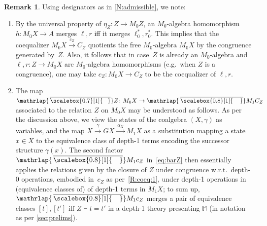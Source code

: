 \documentclass[sigconf,
			final%
			nonacm
                        ]{acmart}
\numberwithin{equation}{section}
\numberwithin{equation}{section}
\theoremstyle{plain}
\theoremstyle{definition}
\newtheorem{rem}[thm]{Remark}
\newcommand{\mybar}[3]{%
  \mathrlap{\hspace{#2}\overline{\scalebox{#1}[1]{\hphantom{\ensuremath{#3}}\vphantom{\rule{0pt}{5.5pt}}}}}\ensuremath{#3}
}
\newcommand{\barM}{\mybar{0.8}{2pt}{M}_1}
\newcommand{\barZ}{\mybar{0.7}{1.75pt}{Z}}
\newcommand{\xra}[1]{\xrightarrow{~#1~}}
\newcommand{\M}{\mathbb{M}}                   %
\newcommand{\E}{\mathcal{E}}   %
\begin{document}
\begin{rem}\label{R:coeq}
  Using designators as in \cref{N:admissible}, we note:
  \begin{enumerate}
  \item\label{R:coeq:1}\label{R:coeq:2} By the universal property of
    $\eta_Z\colon Z \to M_0Z$, an $M_0$-algebra homomorphism
    $h\colon M_0X \to A$ merges $\ell, r$ iff it merges
    $\ell^*_0, r^*_0$. This implies that the coequalizer $M_0X \xra{c_Z}C_Z$
    quotients the free $M_0$-algebra $M_0X$ by the congruence
    generated by~$Z$. Also, it follows that in case~$Z$ is already an
    $M_0$-algebra and $\ell, r\colon Z \to M_0X$ are $M_0$-algebra
    homomorphisms (e.g.~when $Z$ is a congruence), one may take
    $c_Z\colon M_0X \to C_Z$ to be the coequalizer of $\ell, r$.

  \item\label{item:barZ} The map $\barZ\colon M_0X\to\barM C_Z$
    associated to the relation $Z$ on $M_0X$ may be understood as
    follows. As per the discussion above, we view the states of the
    coalgebra $(X,\gamma)$ as variables, and the map
    $X\xra{\gamma} GX\xra{\alpha_X} M_1X$ as a substitution mapping a
    state $x \in X$ to the equivalence class of depth-1 terms encoding
    the successor structure $\gamma(x)$. The second factor $\barM c_Z$
    in~\eqref{eq:barZ} then essentially applies the relations given by
    the closure of $Z$ under congruence w.r.t.~depth-0 operations,
    embodied in~$c_Z$ as per~\ref{R:coeq:1}, under depth-1 operations
    in (equivalence classes of) of depth-1 terms in $M_1X$; to sum up,
    $\barM c_Z$ merges a pair of equivalence classes $[t], [t']$ iff
    $Z\vdash t=t'$ in a depth-1 theory presenting $\M$ (in notation as
    per \cref{sec:prelims}). %
  \end{enumerate}
\end{rem}
\end{document}
